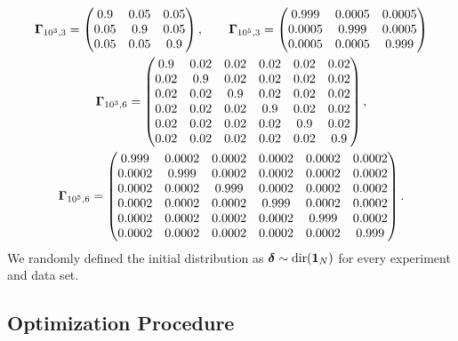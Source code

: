 \begin{gather*}
    \boldsymbol{\Gamma}_{10^3,3} = 
    \begin{pmatrix} 
        0.9 & 0.05 & 0.05 \\
        0.05 & 0.9 & 0.05 \\
        0.05 & 0.05 & 0.9
    \end{pmatrix},
    \qquad
    \boldsymbol{\Gamma}_{10^5,3} = 
    \begin{pmatrix} 
        0.999 & 0.0005 & 0.0005 \\
        0.0005 & 0.999 & 0.0005 \\
        0.0005 & 0.0005 & 0.999
    \end{pmatrix}
    \\
    \boldsymbol{\Gamma}_{10^3,6} = 
    \begin{pmatrix} 
        0.9  & 0.02 & 0.02 & 0.02 & 0.02 & 0.02 \\
        0.02 & 0.9  & 0.02 & 0.02 & 0.02 & 0.02 \\
        0.02 & 0.02 & 0.9  & 0.02 & 0.02 & 0.02 \\
        0.02 & 0.02 & 0.02 & 0.9  & 0.02 & 0.02 \\
        0.02 & 0.02 & 0.02 & 0.02 & 0.9  & 0.02 \\
        0.02 & 0.02 & 0.02 & 0.02 & 0.02 & 0.9  \\
    \end{pmatrix},
    \\
    \boldsymbol{\Gamma}_{10^5,6} = 
    \begin{pmatrix} 
        0.999  & 0.0002 & 0.0002 & 0.0002 & 0.0002 & 0.0002 \\
        0.0002 & 0.999  & 0.0002 & 0.0002 & 0.0002 & 0.0002 \\
        0.0002 & 0.0002 & 0.999  & 0.0002 & 0.0002 & 0.0002 \\
        0.0002 & 0.0002 & 0.0002 & 0.999  & 0.0002 & 0.0002 \\
        0.0002 & 0.0002 & 0.0002 & 0.0002 & 0.999  & 0.0002 \\
        0.0002 & 0.0002 & 0.0002 & 0.0002 & 0.0002 & 0.999  \\
    \end{pmatrix}.
\end{gather*}
%
We randomly defined the initial distribution as $\boldsymbol{\delta} \sim \text{dir}(\mathbf{1}_N)$ for every experiment and data set.

\subsection{Optimization Procedure}

